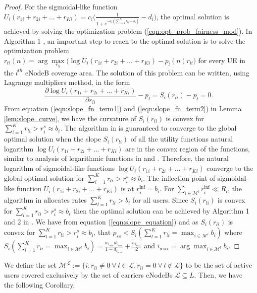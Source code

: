 \documentclass[journal]{IEEEtran} 		\usepackage{amsmath,amssymb}
\begin{document}
\begin{proof}
For the sigmoidal-like function $U_i(r_{1i}+r_{2i}+ ...+r_{Ki}) = c_i\Big(\frac{1}{1+e^{-a_i(\sum_{l=1}^{K}r_{li}-b_i)}}-d_i\Big)$, the optimal solution is achieved by solving the optimization problem (\ref{eqn:opt_prob_fairness_mod}). In Algorithm 1 \cite{Ahmed_Utility4}, an important step to reach to the optimal solution is to solve the optimization problem $r_{li}(n) = \arg \underset{r_{li}}\max \Big(\log U_i(r_{1i}+r_{2i}+ ...+r_{Ki}) - p_l(n)r_{li}\Big)$ for every UE in the $l^{th}$ eNodeB coverage area. The solution of this problem can be written, using Lagrange multipliers method, in the form
\begin{equation}\label{eqn:slope_equation}
\frac{\partial \log U_i(r_{1i}+r_{2i}+ ...+r_{Ki})}{\partial r_{li}}-p_l =  S_i(r_{li}) - p_l = 0.
\end{equation}
From equation (\ref{eqn:slope_fn_term1}) and (\ref{eqn:slope_fn_term2}) in Lemma \ref{lem:slope_curve}, we have the curvature of $S_i(r_{li})$ is convex for $\sum_{l=1}^{K}r_{li}  > r_i^s \approx b_i$. The algorithm in \cite{Ahmed_Utility4} is guaranteed to converge to the global optimal solution when the slope $S_i(r_{li})$ of all the utility functions natural logarithm $\log U_i(r_{1i}+r_{2i}+ ...+r_{Ki})$ are in the convex region of the functions, similar to analysis of logarithmic functions in \cite{kelly98ratecontrol} and \cite{Low99optimizationflow}. Therefore, the natural logarithm of sigmoidal-like functions $\log U_i(r_{1i}+r_{2i}+ ...+r_{Ki})$ converge to the global optimal solution for $\sum_{l=1}^{K}r_{li} > r_i^s \approx b_i$. The inflection point of sigmoidal-like function $U_i(r_{1i}+r_{2i}+ ...+r_{Ki})$ is at $r_i^{\text{inf}} = b_i$. For $\sum_{i \in \mathcal{M}^{l}}r_i^{\text{inf}} \ll R_l$, the algorithm in \cite{Ahmed_Utility4} allocates rates $\sum_{l=1}^{K}r_{li}>b_i$ for all users.
Since $S_i(r_{li})$ is convex for $\sum_{l=1}^{K}r_{li}>r_i^s \approx b_i$ then the optimal solution can be achieved by Algorithm 1 and 2 in \cite{Ahmed_Utility4}. We have from equation (\ref{eqn:slope_equation}) and as $S_i(r_{li})$ is convex for $\sum_{l=1}^{K}r_{li} > r_i^s \approx b_i$, that $p_{ss}< S_i(\sum_{l=1}^{K}r_{li} =\max_{i \in \mathcal{M}^{l}} b_i)$ where $S_i(\sum_{l=1}^{K}r_{li} =\max_{i \in \mathcal{M}^{l}} b_i) = \frac{a_{i_{\max}} d_{i_{\max}} }{1-d_{i_{\max}} }+\frac{a_{i_{\max} }}{2}$ and $i_{\max} = \arg \max_{i \in \mathcal{M}^{l}} b_i$.
\end{proof}
We define the set $\mathcal{M}^{\mathcal{L}}:=\{i:r_{li} \neq 0 \: \forall \: l\in \mathcal{L}, r_{li} = 0 \: \forall \: l\notin \mathcal{L} \}$ to be the set of active users covered exclusively by the set of carriers eNodeBs $\mathcal{L} \subseteq L$. Then, we have the following Corollary.
\end{document}
